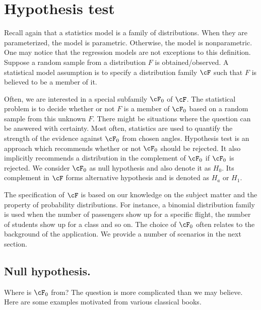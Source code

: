 \chapter{Hypothesis test}

Recall again that a statistics model is a family of distributions.
When they are parameterized, the model is parametric.
Otherwise, the model is nonparametric. One may notice that
the regression models are not exceptions to this definition.
Suppose a random sample from a distribution 
$F$ is obtained/observed. A statistical model assumption is
to specify a distribution family $\cF$ such that
$F$ is believed to be a member of it. 

Often, we are interested in a special subfamily $\cF_0$ of $\cF$.
The statistical problem is to decide whether or not $F$ is a member 
of $\cF_0$ based on a random sample from this unknown $F$.
There might be situations where the question can be answered with
certainty. Most often, statistics are used to quantify the strength of the 
evidence against $\cF_0$ from chosen angles. 
Hypothesis test is an approach which recommends
whether or not $\cF_0$ should be rejected. It also implicitly
recommends a distribution in the complement of $\cF_0$ if
$\cF_0$ is rejected.
We consider $\cF_0$ as null hypothesis and also denote it
as $H_0$. Its complement in $\cF$ forms alternative hypothesis
and is denoted as $H_a$ or $H_1$. 

The specification of $\cF$ is based on our knowledge on the
subject matter and the property of probability distributions.
For instance, a binomial distribution family is used when
the number of passengers show up for a specific flight,
the number of students show up for a class and so on.
The choice of $\cF_0$ often relates to the background of the
application. We provide a number of scenarios in the
next section.

\section{Null hypothesis.}
Where is $\cF_0$ from? The question is more complicated than
we may believe. Here are some examples motivated from
various classical books.

